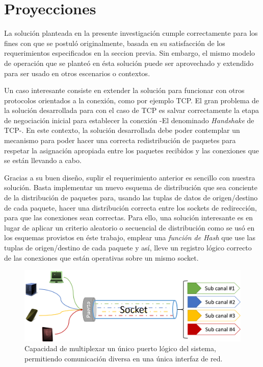 \section{Proyecciones}
La solución planteada en la presente investigación cumple correctamente para los fines con que se postuló originalmente, basada en su satisfacción de los requerimientos especificados en la seccion previa. Sin embargo, el mismo modelo de operación que se planteó en ésta solución puede ser aprovechado y extendido para ser usado en otros escenarios o contextos.

Un caso interesante consiste en extender la solución para funcionar con otros protocolos orientados a la conexión, como por ejemplo TCP. El gran problema de la solución desarrollada para con el caso de TCP es salvar correctamente la etapa de negociación inicial para establecer la conexión -El denominado \emph{Handshake} de TCP-. En este contexto, la solución desarrollada debe poder contemplar un mecanismo para poder hacer una correcta redistribución de paquetes para respetar la asignación apropiada entre los paquetes recibidos y las conexiones que se están llevando a cabo.

Gracias a su buen diseño, suplir el requerimiento anterior es sencillo con nuestra solución. Basta implementar un nuevo esquema de distribución que sea conciente de la distribución de paquetes para, usando las tuplas de datos de origen/destino de cada paquete, hacer una distribución correcta entre los sockets de redirección, para que las conexiones sean correctas. Para ello, una solución interesante es en lugar de aplicar un criterio aleatorio o secuencial de distribución como se usó en los esquemas provistos en éste trabajo, emplear una \emph{función de Hash} que use las tuplas de origen/destino de cada paquete y así, lleve un registro lógico correcto de las conexiones que están operativas sobre un mismo socket.

\begin{figure}[!h]
	\centering
	\includegraphics[scale=.5]{imagenes/socketMultiplexed.png}
	\caption{Capacidad de multiplexar un único puerto lógico del sistema, permitiendo comunicación diversa en una única interfaz de red.}
	\label{fig:multiplexarPuerto}
\end{figure}

